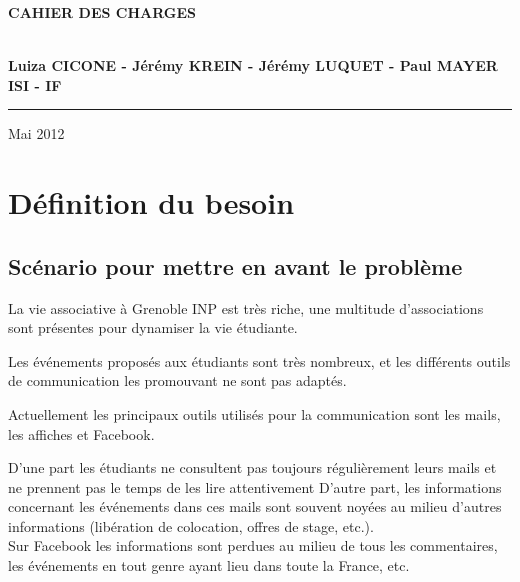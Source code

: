 \documentclass[a4paper, 11px]{article}
\begin{document}
\begin{titlepage}
\begin{center}
\begin{center}
{\Huge \bf CAHIER DES CHARGES}


\end{center}


\vspace{1cm}

\begin{center}
$ $\\
\large{ \textbf{Luiza CICONE - Jérémy KREIN - Jérémy LUQUET - Paul MAYER}}\\
\large{ \textbf{ISI - IF}}
$ $\\
\end{center}
\rule{\linewidth}{.5pt}


\vfill


{\large Mai 2012}

\end{center}
\end{titlepage}

\tableofcontents

\newpage


\section{Définition du besoin}

\subsection{Scénario pour mettre en avant le problème}

La vie associative à Grenoble INP est très riche, une multitude d'associations sont présentes pour dynamiser la vie étudiante.

Les événements proposés aux étudiants sont très nombreux, et les différents outils de communication les promouvant ne sont pas adaptés.

Actuellement les principaux outils utilisés pour la communication sont les mails, les affiches et Facebook.

D'une part les étudiants ne consultent pas toujours régulièrement leurs mails et ne prennent pas le temps de les lire attentivement D'autre part, les informations concernant les événements dans ces mails sont souvent noyées au milieu d'autres informations (libération de colocation, offres de stage, etc.).\\

Sur Facebook les informations sont perdues au milieu de tous les commentaires, les événements en tout genre ayant lieu dans toute la France, etc.\\
\end{document}
